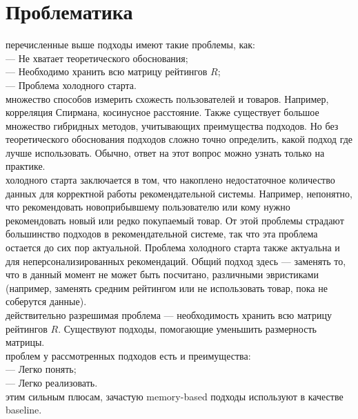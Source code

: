 \documentclass{article}
\newcommand\tab[1][1cm]{\hspace*{#1}}
\begin{document}
\section{Проблематика}
 перечисленные выше подходы имеют такие проблемы, как:\\
\tab— Не хватает теоретического обоснования;\\
\tab— Необходимо хранить всю матрицу рейтингов ﻿$R$;\\
\tab— Проблема холодного старта.\\
 множество способов измерить схожесть пользователей и товаров. Например, корреляция Спирмана, косинусное расстояние. Также существует большое множество гибридных методов, учитывающих преимущества подходов. Но без теоретического обоснования подходов сложно точно определить, какой подход где лучше использовать. Обычно, ответ на этот вопрос можно узнать только на практике.\\
 холодного старта заключается в том, что накоплено недостаточное количество данных для корректной работы рекомендательной системы. Например, непонятно, что рекомендовать новоприбывшему пользователю или кому нужно рекомендовать новый или редко покупаемый товар. От этой проблемы страдают большинство подходов в рекомендательной системе, так что эта проблема остается до сих пор актуальной. Проблема холодного старта также актуальна и для неперсонализированных рекомендаций. Общий подход здесь — заменять то, что в данный момент не может быть посчитано, различными эвристиками (например, заменять средним рейтингом или не использовать товар, пока не соберутся данные).\\
 действительно разрешимая проблема — необходимость хранить всю матрицу рейтингов ﻿$R$. Существуют подходы, помогающие уменьшить размерность матрицы.\\
 проблем у рассмотренных подходов есть и преимущества:\\
\tab— Легко понять;\\
\tab— Легко реализовать.\\
 этим сильным плюсам, зачастую memory-based подходы используют в качестве baseline.
\end{document}
